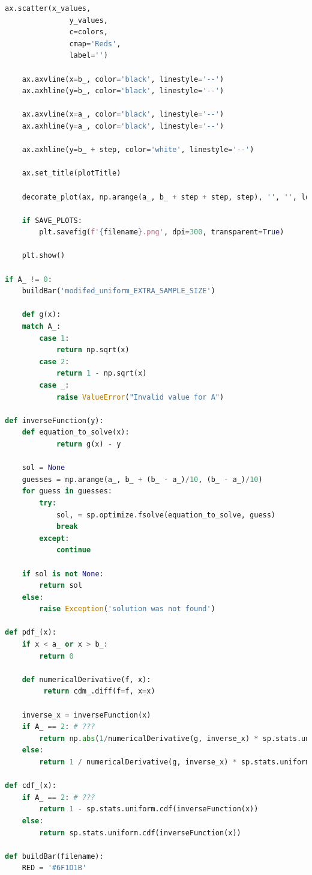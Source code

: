 \documentclass[a4paper, 14pt]{extarticle}
\begin{document}
\begin{center}
\begin{lstlisting}[language=Python]
    ax.scatter(x_values, 
               y_values, 
               c=colors, 
               cmap='Reds',
               label='')
    
    ax.axvline(x=b_, color='black', linestyle='--')
    ax.axhline(y=b_, color='black', linestyle='--')

    ax.axvline(x=a_, color='black', linestyle='--')
    ax.axhline(y=a_, color='black', linestyle='--')

    ax.axhline(y=b_ + step, color='white', linestyle='--')

    ax.set_title(plotTitle)

    decorate_plot(ax, np.arange(a_, b_ + step + step, step), '', '', loc='best')
    
    if SAVE_PLOTS:
        plt.savefig(f'{filename}.png', dpi=300, transparent=True)

    plt.show()

if A_ != 0:
    buildBar('modifed_uniform_EXTRA_SAMPLE_SIZE')

    def g(x):
    match A_:
        case 1:
            return np.sqrt(x)
        case 2:
            return 1 - np.sqrt(x)
        case _:
            raise ValueError("Invalid value for A")

def inverseFunction(y):
    def equation_to_solve(x):
            return g(x) - y

    sol = None
    guesses = np.arange(a_, b_ + (b_ - a_)/10, (b_ - a_)/10)
    for guess in guesses:
        try: 
            sol, = sp.optimize.fsolve(equation_to_solve, guess)
            break
        except:
            continue
    
    if sol is not None: 
        return sol
    else: 
        raise Exception('solution was not found')

def pdf_(x):
    if x < a_ or x > b_:
        return 0

    def numericalDerivative(f, x):
         return cdm_.diff(f=f, x=x)
    
    inverse_x = inverseFunction(x)
    if A_ == 2: # ???
        return np.abs(1/numericalDerivative(g, inverse_x) * sp.stats.uniform.pdf(inverse_x))
    else:
        return 1 / numericalDerivative(g, inverse_x) * sp.stats.uniform.pdf(inverse_x)

def cdf_(x):
    if A_ == 2: # ???
        return 1 - sp.stats.uniform.cdf(inverseFunction(x))
    else:
        return sp.stats.uniform.cdf(inverseFunction(x))

def buildBar(filename):
    RED = '#6F1D1B'


\end{lstlisting}
\end{center}
\end{document}

